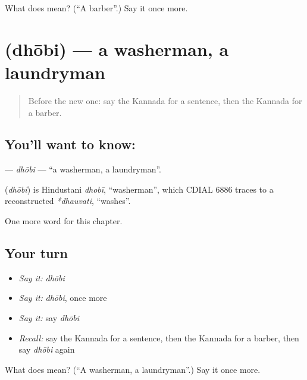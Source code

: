 \begin{tcolorbox}[breakable,colback=teal!4,colframe=teal!35!black,title={Before you move on}]
What does  mean? (\textquotedblleft{}A barber\textquotedblright{}.) Say it once more.
\end{tcolorbox}
\section[\texorpdfstring{\kn{ಧೋಬಿ} (dhōbi)}{ಧೋಬಿ (dhōbi)}]{ (dhōbi) — a washerman, a laundryman}

\label{lesson:KA-C270-dhobi}



\begin{quote}
Before the new one: say the Kannada for a sentence, then the Kannada for a barber.
\end{quote}

\subsection*{You'll want to know: }
\textbf{} — \emph{dhōbi} — \textquotedblleft{}a washerman, a laundryman\textquotedblright{}.

\begin{cousinweb}
\textbf{} (\emph{dhōbi}) is Hindustani \emph{dhobī}, \textquotedblleft{}washerman\textquotedblright{}, which CDIAL 6886 traces to a reconstructed \emph{*dhauvati}, \textquotedblleft{}washes\textquotedblright{}.
\end{cousinweb}

\begin{grammarlens}[title={What you've built}]
One more word for this chapter.
\end{grammarlens}

\subsection*{Your turn}
\begin{itemize}
\raggedright
  \item \emph{Say it:} \emph{dhōbi}
  \item \emph{Say it:} \emph{dhōbi}, once more
  \item \emph{Say it:} say \emph{dhōbi}
  \item \emph{Recall:} say the Kannada for a sentence, then the Kannada for a barber, then say \emph{dhōbi} again
\end{itemize}

\begin{tcolorbox}[breakable,colback=teal!4,colframe=teal!35!black,title={Before you move on}]
What does  mean? (\textquotedblleft{}A washerman, a laundryman\textquotedblright{}.) Say it once more.
\end{tcolorbox}

